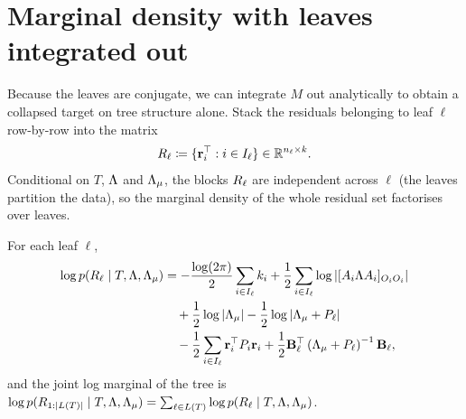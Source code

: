 \section{Marginal density with leaves integrated out}
\label{sec:mv-marg-lik}

Because the leaves are conjugate, we can integrate $M$ out analytically to
obtain a collapsed target on tree structure alone. Stack the residuals
belonging to leaf $\ell$ row-by-row into the matrix
\begin{equation}
	\label{eq:mv-Rell}
	R_\ell \coloneqq \{ \mathbf{r}_i^\top : i \in I_\ell \} \in \mathbb{R}^{n_\ell \times k}.
\end{equation}
Conditional on $T$, $\Lambda$ and $\Lambda_{\mu}$, the blocks $R_\ell$ are
independent across $\ell$ (the leaves partition the data), so the marginal
density of the whole residual set factorises over leaves.

\begin{prop}
	\label{prop:mv-marglik}
	For each leaf $\ell$,
	\begin{align}
		\log p(R_\ell \mid T, \Lambda, \Lambda_{\mu})
		 & = -\frac{\log(2\pi)}{2}\sum_{i \in I_\ell} k_i
		+ \frac{1}{2}\sum_{i \in I_\ell}\log\left|[A_i\Lambda A_i]_{O_iO_i}\right|
		\label{eq:mv-marglik-a}            \\
		 & \quad
		+ \frac{1}{2}\log|\Lambda_{\mu}|
		- \frac{1}{2}\log\left|\Lambda_{\mu} + P_\ell\right|
		\label{eq:mv-marglik-b}            \\
		 & \quad
		- \frac{1}{2}\sum_{i \in I_\ell} \mathbf{r}_i^\top P_i \mathbf{r}_i
		+ \frac{1}{2} \mathbf{B}_\ell^\top \left(\Lambda_{\mu} + P_\ell\right)^{-1}
		\mathbf{B}_\ell,
		\label{eq:mv-marglik-c}
	\end{align}
	and the joint log marginal of the tree is
	$\log p(R_{1:|L(T)|} \mid T, \Lambda, \Lambda_{\mu}) = \sum_{\ell \in L(T)}
		\log p(R_\ell \mid T, \Lambda, \Lambda_{\mu})$.
\end{prop}

